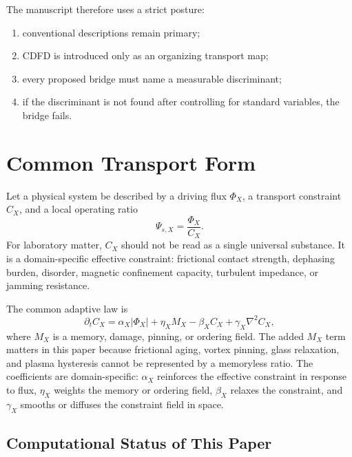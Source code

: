 \documentclass[11pt]{article}
\begin{document}
The manuscript therefore uses a strict posture:
\begin{enumerate}
    \item conventional descriptions remain primary;
    \item CDFD is introduced only as an organizing transport map;
    \item every proposed bridge must name a measurable discriminant;
    \item if the discriminant is not found after controlling for standard variables, the bridge fails.
\end{enumerate}

\section{Common Transport Form}

Let a physical system be described by a driving flux $\Phi_X$, a transport constraint $C_X$, and a local operating ratio
\begin{equation}
    \Psi_{s,X}=\frac{\Phi_X}{C_X}.
\end{equation}
For laboratory matter, $C_X$ should not be read as a single universal substance. It is a domain-specific effective constraint: frictional contact strength, dephasing burden, disorder, magnetic confinement capacity, turbulent impedance, or jamming resistance.

The common adaptive law is
\begin{equation}
    \partial_t C_X
    =
    \alpha_X|\Phi_X|
    +\eta_X M_X
    -\beta_X C_X
    +\gamma_X\nabla^2 C_X,
    \label{eq:adaptive_constraint}
\end{equation}
where $M_X$ is a memory, damage, pinning, or ordering field. The added $M_X$ term matters in this paper because frictional aging, vortex pinning, glass relaxation, and plasma hysteresis cannot be represented by a memoryless ratio.
The coefficients are domain-specific: $\alpha_X$ reinforces the effective
constraint in response to flux, $\eta_X$ weights the memory or ordering field,
$\beta_X$ relaxes the constraint, and $\gamma_X$ smooths or diffuses the
constraint field in space.

\subsection{Computational Status of This Paper}
\end{document}
